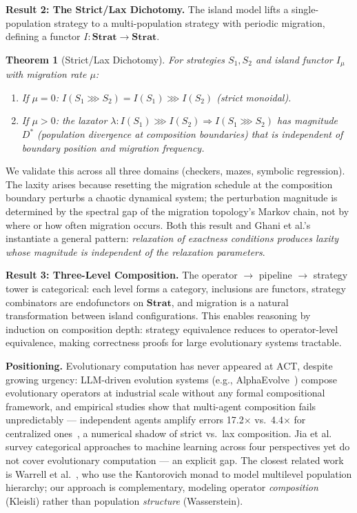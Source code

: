 \documentclass[10pt]{article}
\newtheorem{theorem}{Theorem}
\begin{document}
\textbf{Result 2: The Strict/Lax Dichotomy.}
The island model lifts a single-population strategy to a multi-population strategy with periodic migration, defining a functor $I \colon \mathbf{Strat} \to \mathbf{Strat}$.

\begin{theorem}[Strict/Lax Dichotomy]
For strategies $S_1, S_2$ and island functor $I_{\mu}$ with migration rate $\mu$:
\begin{enumerate}[nosep,leftmargin=1.5em]
  \item If $\mu = 0$: $I(S_1 \ggg S_2) = I(S_1) \ggg I(S_2)$ \emph{(strict monoidal)}.
  \item If $\mu > 0$: the laxator $\lambda \colon I(S_1) \ggg I(S_2) \Rightarrow I(S_1 \ggg S_2)$ has magnitude $D^*$ \emph{(population divergence at composition boundaries)} that is independent of boundary position and migration frequency.
\end{enumerate}
\end{theorem}

\noindent
We validate this across all three domains (checkers, mazes, symbolic regression). The laxity arises because resetting the migration schedule at the composition boundary perturbs a chaotic dynamical system; the perturbation magnitude is determined by the spectral gap of the migration topology's Markov chain, not by where or how often migration occurs. Both this result and Ghani et al.'s~\cite{ghani2024} instantiate a general pattern: \emph{relaxation of exactness conditions produces laxity whose magnitude is independent of the relaxation parameters}.

\textbf{Result 3: Three-Level Composition.}
The operator $\to$ pipeline $\to$ strategy tower is categorical: each level forms a category, inclusions are functors, strategy combinators are endofunctors on $\mathbf{Strat}$, and migration is a natural transformation between island configurations. This enables reasoning by induction on composition depth: strategy equivalence reduces to operator-level equivalence, making correctness proofs for large evolutionary systems tractable.

\textbf{Positioning.}
Evolutionary computation has never appeared at ACT, despite growing urgency: LLM-driven evolution systems (e.g., AlphaEvolve~\cite{alphaevolve2025}) compose evolutionary operators at industrial scale without any formal compositional framework, and empirical studies show that multi-agent composition fails unpredictably --- independent agents amplify errors 17.2$\times$ vs.\ 4.4$\times$ for centralized ones~\cite{chen2025}, a numerical shadow of strict vs.\ lax composition. Jia et al.~\cite{jia2025} survey categorical approaches to machine learning across four perspectives yet do not cover evolutionary computation --- an explicit gap. The closest related work is Warrell et al.~\cite{warrell2024}, who use the Kantorovich monad to model multilevel population hierarchy; our approach is complementary, modeling operator \emph{composition} (Kleisli) rather than population \emph{structure} (Wasserstein).
\end{document}
